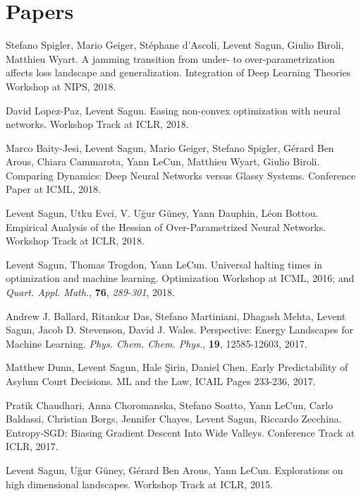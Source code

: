 \documentclass[10pt,letterpaper]{article}
\renewenvironment{itemize}
{
\begin{list}{}{\setlength{\leftmargin}{1.5em}}
}
{
  \end{list}
}
\begin{document}
\section*{Papers}
\begin{itemize}
\item Stefano Spigler, Mario Geiger, St\'ephane d'Ascoli, Levent Sagun, Giulio Biroli, Matthieu Wyart. A jamming transition from under- to over-parametrization affects loss landscape and generalization. Integration of Deep Learning Theories Workshop at NIPS, 2018.

\item David Lopez-Paz, Levent Sagun. Easing non-convex optimization with neural networks. Workshop Track at ICLR, 2018.

\item Marco Baity-Jesi, Levent Sagun, Mario Geiger, Stefano Spigler, G\'erard Ben Arous, Chiara Cammarota, Yann LeCun, Matthieu Wyart, Giulio Biroli. Comparing Dynamics: Deep Neural Networks versus Glassy Systems. Conference Paper at ICML, 2018.

\item Levent Sagun, Utku Evci, V. U\u{g}ur G\"uney, Yann Dauphin, L\'eon Bottou. Empirical Analysis of the Hessian of Over-Parametrized Neural Networks. Workshop Track at ICLR, 2018.

\item  Levent Sagun, Thomas Trogdon, Yann LeCun. Universal halting times in optimization and machine learning. Optimization Workshop at ICML, 2016; and \textit{Quart. Appl. Math.}, \textbf{76}, \textit{289-301}, 2018.

\item Andrew J. Ballard, Ritankar Das, Stefano Martiniani, Dhagash Mehta, Levent Sagun, Jacob D. Stevenson, David J. Wales. Perspective: Energy Landscapes for Machine Learning. \textit{Phys. Chem. Chem. Phys.}, \textbf{19}, 12585-12603, 2017.

\item Matthew Dunn, Levent Sagun, Hale \c{S}irin, Daniel Chen. Early Predictability of Asylum Court Decisions. ML and the Law, ICAIL Pages 233-236, 2017.

\item Pratik Chaudhari, Anna Choromanska, Stefano Soatto, Yann LeCun, Carlo Baldassi, Christian Borgs, Jennifer Chayes, Levent Sagun, Riccardo Zecchina. Entropy-SGD: Biasing Gradient Descent Into Wide Valleys. Conference Track at ICLR, 2017.


\item  Levent Sagun, U\u{g}ur G\"uney, G\'erard Ben Arous, Yann LeCun. Explorations on high dimensional landscapes. Workshop Track at ICLR, 2015.
\end{itemize}
\end{document}
